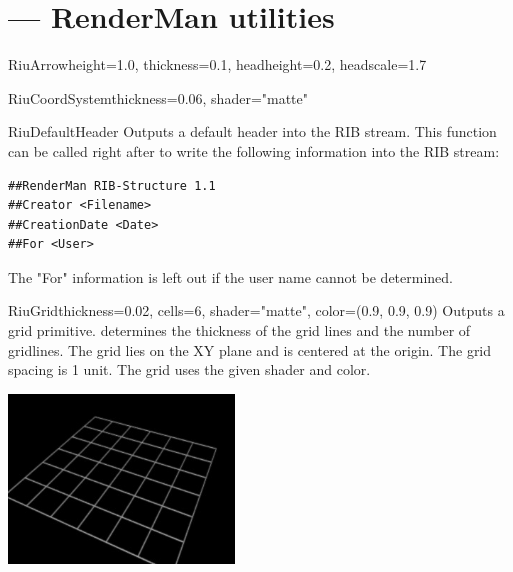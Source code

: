 \section{ ---
         RenderMan utilities}


\begin{funcdesc}{RiuArrow}{height=1.0, thickness=0.1, headheight=0.2, headscale=1.7}
\end{funcdesc}

\begin{funcdesc}{RiuCoordSystem}{thickness=0.06, shader="matte"}
\end{funcdesc}

\begin{funcdesc}{RiuDefaultHeader}{}
Outputs a default header into the RIB stream. This function can be
called right after  to write the following
information into the RIB stream:

\begin{verbatim}
##RenderMan RIB-Structure 1.1
##Creator <Filename>
##CreationDate <Date>
##For <User>
\end{verbatim}

The "For" information is left out if the user name cannot be determined.
\end{funcdesc}

\begin{funcdesc}{RiuGrid}{thickness=0.02, cells=6, shader="matte", color=(0.9, 0.9, 0.9)}
Outputs a grid primitive.  determines the thickness of the
grid lines and  the number of gridlines. The grid lies on the XY
plane and is centered at the origin. The grid spacing is 1 unit. The
grid uses the given shader and color.

\begin{center}
\includegraphics[width=6cm]{pics/grid}
\end{center}
\end{funcdesc}
